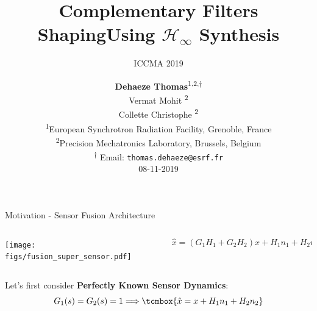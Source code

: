 \documentclass[t]{clean-beamer}
\author{\textbf{Dehaeze Thomas}\textsuperscript{1,2,$\dagger$} \\ Vermat Mohit \textsuperscript{2} \\ Collette Christophe \textsuperscript{2} \\ \vspace{0.5cm} \textsuperscript{1}European Synchrotron Radiation Facility, Grenoble, France\\ \textsuperscript{2}Precision Mechatronics Laboratory, Brussels, Belgium\\ \textsuperscript{$\dagger$} Email: {\tt\small thomas.dehaeze@esrf.fr}\\ \vspace{0.5cm} 08-11-2019}
\date{}
\title{Complementary Filters Shaping\newline Using \(\mathcal{H}_\infty\) Synthesis}
\subtitle{ICCMA 2019}
\begin{document}
\maketitle

\begin{frame}[label={sec:org33dd1ff}]{Motivation - Sensor Fusion Architecture}
\vspace{-1em}
\begin{columns}
\begin{column}{0.45\columnwidth}
\vspace{-1em}
\begin{center}
\texttt{[image: figs/fusion\_super\_sensor.pdf]}
\end{center}
\end{column}

\begin{column}{0.55\columnwidth}
\begin{equation*}
  \hat{x} = \left(G_1 H_1 + G_2 H_2\right) x + H_1 n_1 + H_2 n_2
\end{equation*}

\vspace{0.5em}
\end{column}
\end{columns}

\vspace{0.5em}
Let's first consider \textbf{Perfectly Known Sensor Dynamics}:
\begin{equation*}
  G_1(s) = G_2(s) = 1 \Longrightarrow \tcmbox{\hat{x} = x + H_1 n_1 + H_2 n_2}
\end{equation*}

\vspace{0.5em}
\end{frame}
\end{document}
